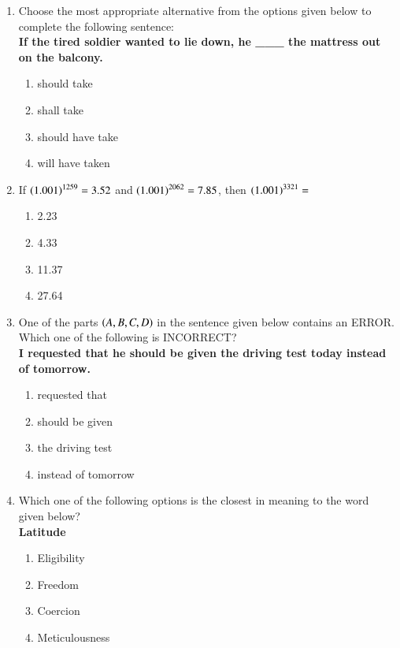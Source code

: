 \documentclass[journal]{IEEEtran}
\begin{document}
\begin{enumerate}
    \item {Choose the most appropriate alternative from the options given below to complete the following
    sentence: \\ \textbf{
    If the tired soldier wanted to lie down, he \_\_\_ the mattress out on the balcony.}
    \begin{multicols}{4}
    	\begin{enumerate}
    		\item should take 
    		\item shall take
    		\item should have take
    		\item will have taken
    	\end{enumerate}
    \end{multicols}}    
    \item {If $\left(1.001\right)^{1259} = 3.52$ and $\left(1.001\right)^{2062} = 7.85$, then $\left(1.001\right)^{3321} =$
    	\begin{multicols}{4}
	    	\begin{enumerate}
	    		\item 2.23 
	    		\item 4.33 
	    		\item 11.37 
	    		\item 27.64
	    	\end{enumerate}
    	\end{multicols}}    
    \item {One of the parts $\left(A, B, C, D\right)$ in the sentence given below contains an ERROR. Which one of the
    following is INCORRECT? \\ 
    \textbf{I requested that he should be given the driving test today instead of tomorrow.}
        \begin{multicols}{2}
	    	\begin{enumerate}
				\item requested that
				\item should be given
				\item the driving test
				\item instead of tomorrow
	    	\end{enumerate}
    	\end{multicols}
	}
    \item {Which one of the following options is the closest in meaning to the word given below?\\
    \textbf{Latitude}
    	\begin{multicols}{4}
    		\begin{enumerate}
    			\item Eligibility
    			\item Freedom
    			\item Coercion
    			\item Meticulousness
    		\end{enumerate}
    	\end{multicols}
    
}
\end{enumerate}
\end{document}
